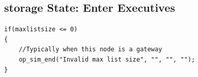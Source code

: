 \subsection{storage State: Enter Executives}
{\tiny
\begin{verbatim}
if(maxlistsize <= 0)
{
	//Typically when this node is a gateway
	op_sim_end("Invalid max list size", "", "", "");
}
\end{verbatim}
}
